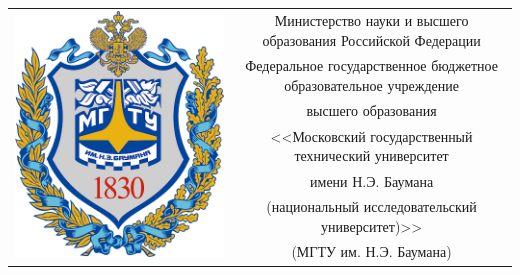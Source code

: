 \begin{titlepage}
    \centering

     \begin{table}[H]
        \footnotesize
        \bfseries
        \centering
        \begin{tabular}{cc}
            \multirow{7}{*}{\includegraphics[scale=0.15]{images/bmstu_logo.png}}
            & Министерство науки и высшего образования Российской Федерации \\
            & Федеральное государственное бюджетное образовательное учреждение \\
            & высшего образования \\
            & <<Московский государственный технический университет \\
            & имени Н.Э. Баумана \\
            & (национальный исследовательский университет)>> \\
            & (МГТУ им. Н.Э. Баумана) \\
        \end{tabular}
    \end{table}

    \vspace{-2.4cm}


\end{titlepage}
